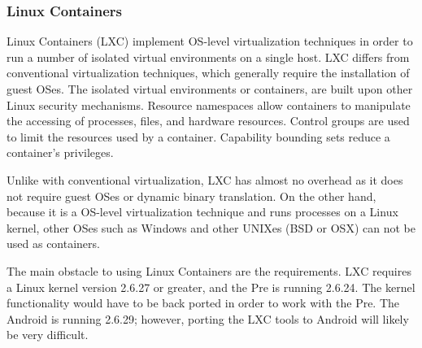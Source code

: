 \subsubsection{Linux Containers}
Linux Containers (LXC) implement OS-level virtualization techniques in order to run a number of isolated virtual environments on a single host.  LXC differs from conventional virtualization techniques, which generally require the installation of guest OSes.  The isolated virtual environments or containers, are built upon other Linux security mechanisms.  Resource namespaces allow containers to manipulate the accessing of processes, files, and hardware resources.  Control groups are used to limit the resources used by a container.  Capability bounding sets reduce a container's privileges.  

Unlike with conventional virtualization, LXC has almost no overhead as it does not require guest OSes or dynamic binary translation.  On the other hand, because it is a OS-level virtualization technique and runs processes on a Linux kernel, other OSes such as Windows and other UNIXes (BSD or OSX) can not be used as containers.  

The main obstacle to using Linux Containers are the requirements.  LXC requires a Linux kernel version 2.6.27 or greater, and the Pre is running 2.6.24.  The kernel functionality would have to be back ported in order to work with the Pre.  The Android is running 2.6.29; however, porting the LXC tools to Android will likely be very difficult.
